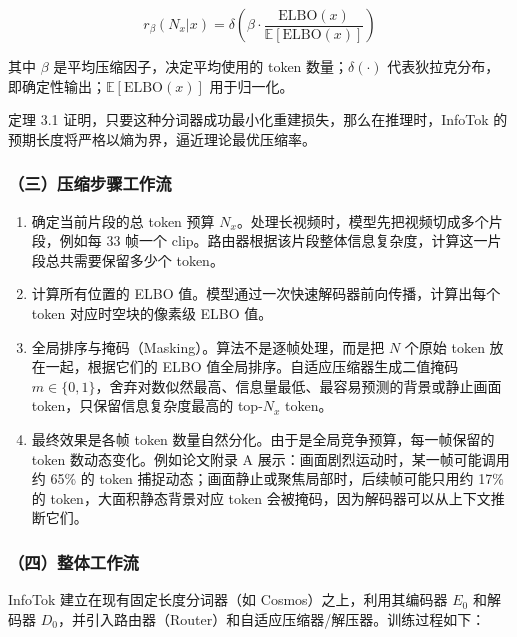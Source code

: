 \[
r_\beta(N_x|x) =
\delta\left(
\beta\cdot
\frac{\mathrm{ELBO}(x)}
{\mathbb{E}[\mathrm{ELBO}(x)]}
\right)
\]

其中 \(\beta\) 是平均压缩因子，决定平均使用的 token 数量；\(\delta(\cdot)\) 代表狄拉克分布，即确定性输出；\(\mathbb{E}[\mathrm{ELBO}(x)]\) 用于归一化。

定理 3.1 证明，只要这种分词器成功最小化重建损失，那么在推理时，InfoTok 的预期长度将严格以熵为界，逼近理论最优压缩率。

\hypertarget{ux4e09ux538bux7f29ux6b65ux9aa4ux5de5ux4f5cux6d41}{%
\subsubsection{（三）压缩步骤工作流}\label{ux4e09ux538bux7f29ux6b65ux9aa4ux5de5ux4f5cux6d41}}

\begin{enumerate}
\def\labelenumi{\arabic{enumi}.}
\tightlist
\item
  确定当前片段的总 token 预算 \(N_x\)。处理长视频时，模型先把视频切成多个片段，例如每 33 帧一个 clip。路由器根据该片段整体信息复杂度，计算这一片段总共需要保留多少个 token。
\item
  计算所有位置的 ELBO 值。模型通过一次快速解码器前向传播，计算出每个 token 对应时空块的像素级 ELBO 值。
\item
  全局排序与掩码（Masking）。算法不是逐帧处理，而是把 \(N\) 个原始 token 放在一起，根据它们的 ELBO 值全局排序。自适应压缩器生成二值掩码 \(m\in\{0,1\}\)，舍弃对数似然最高、信息量最低、最容易预测的背景或静止画面 token，只保留信息复杂度最高的 top-\(N_x\) token。
\item
  最终效果是各帧 token 数量自然分化。由于是全局竞争预算，每一帧保留的 token 数动态变化。例如论文附录 A 展示：画面剧烈运动时，某一帧可能调用约 65\% 的 token 捕捉动态；画面静止或聚焦局部时，后续帧可能只用约 17\% 的 token，大面积静态背景对应 token 会被掩码，因为解码器可以从上下文推断它们。
\end{enumerate}

\hypertarget{ux56dbux6574ux4f53ux5de5ux4f5cux6d41}{%
\subsubsection{（四）整体工作流}\label{ux56dbux6574ux4f53ux5de5ux4f5cux6d41}}

InfoTok 建立在现有固定长度分词器（如 Cosmos）之上，利用其编码器 \(E_0\) 和解码器 \(D_0\)，并引入路由器（Router）和自适应压缩器/解压器。训练过程如下：

